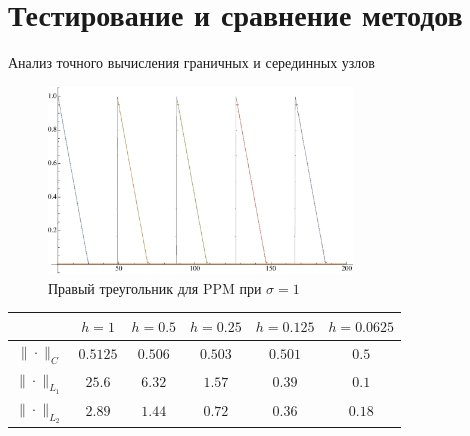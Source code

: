 \documentclass[unicode, 8pt]{beamer}
\begin{document}
    \section{Тестирование и сравнение методов}
    \begin{frame}{Анализ точного вычисления граничных и серединных узлов}
        \begin{figure}[h]
            \centering
            \includegraphics[width=0.72\textwidth]{sigma=1./advectionPPM_rightTriangle.pdf}
            \caption{Правый треугольник для PPM при $ \sigma = 1 $}
            \label{fig:ppm_rightTriangle_1}
        \end{figure}
        \begin{center}
            \begin{tabular}{ |c|c|c|c|c|c| } 
             \hline
              & $ h=1 $ &  $ h=0.5$ &  $ h=0.25 $ &  $ h=0.125 $ &  $ h=0.0625 $ \\ 
             \hline
             $\| \cdot \|_{C}$ & $0.5125$ & $0.506$ & $0.503$ & $0.501$ & $0.5$
             \\
             \hline
             $\| \cdot \|_{L_1}$ & $25.6$ & $6.32$ & $1.57$ & $0.39$ & $0.1$
             \\
             \hline
             $\| \cdot \|_{L_2}$ & $2.89$ & $1.44$ & $0.72$ & $0.36$ & $0.18$ \\
             \hline 
            \end{tabular}
        \end{center}
    \end{frame}
\end{document}
